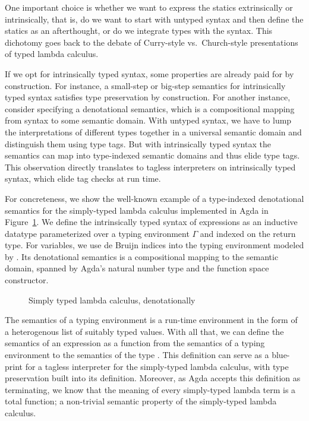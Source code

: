 \documentclass[acmsmall,anonymous,review,screen]{acmart}
\begin{document}
One important choice is whether we want to express the statics
extrinsically or intrinsically, that is, do we want to start with
untyped syntax and then define the statics as an afterthought, or do
we integrate types with the syntax. This dichotomy goes back to the
debate of Curry-style vs.\ Church-style presentations of typed lambda
calculus.

If we opt for intrinsically typed syntax, some properties are already paid
for by construction. For instance, a small-step or big-step semantics
for intrinsically typed
syntax satisfies type preservation by construction. For another
instance, consider specifying a denotational semantics, which is a
compositional mapping from syntax to some semantic domain. With 
untyped syntax, we have to lump the interpretations of
different types together in a universal semantic domain and distinguish them using type tags. But
with intrinsically typed syntax the semantics can map into
type-indexed semantic domains 
and thus elide type tags. This observation directly translates to tagless interpreters
on intrinsically typed syntax, which elide tag checks at run time.

For concreteness, we show the well-known example of a type-indexed
denotational semantics for the simply-typed lambda calculus implemented in Agda in
Figure~\ref{fig:stlc}. 
We define the intrinsically typed syntax of expressions as an
inductive datatype  {\AExpr} parameterized over a typing environment $\Gamma$ and indexed on the return
type. For variables, we use de Bruijn indices into the typing
environment modeled by {\AVar}.
Its denotational semantics is a compositional mapping to the semantic domain, spanned by Agda's
natural number type and the function space constructor. 

\begin{figure}[tp]
  
  \caption{Simply typed lambda calculus, denotationally}
  \label{fig:stlc}
\end{figure}

The semantics of a typing environment is a run-time environment in the
form of a heterogenous list of suitably typed values. With all that,
we can define the semantics of an expression {\AESem} as a function from
the semantics of a typing environment {\AGSem} to the semantics of the type
{\ATSem}.  This definition can serve as a blue-print for a tagless interpreter for
the simply-typed lambda calculus, with type preservation
built into its definition. Moreover, as Agda accepts this
definition as terminating, we know that the meaning of every
simply-typed lambda term is a total function; a non-trivial semantic property
of the simply-typed lambda calculus.
\end{document}
